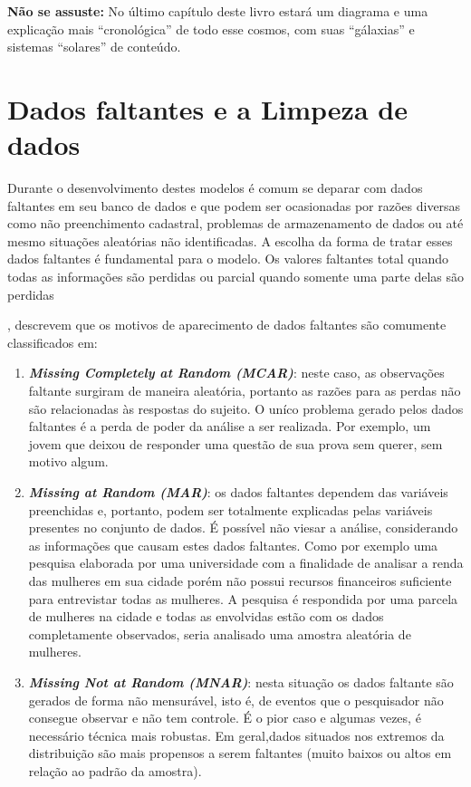 \documentclass[
  openany]{book}
\begin{document}
\textbf{Não se assuste:} No último capítulo deste livro estará um diagrama e uma explicação mais ``cronológica'' de todo esse cosmos, com suas ``gálaxias'' e sistemas ``solares'' de conteúdo.

\hypertarget{dados-faltantes-e-a-limpeza-de-dados}{%
\section{Dados faltantes e a Limpeza de dados}\label{dados-faltantes-e-a-limpeza-de-dados}}

Durante o desenvolvimento destes modelos é comum se deparar com dados faltantes em seu banco de dados e que podem ser ocasionadas por razões diversas como não preenchimento cadastral, problemas de armazenamento de dados ou até mesmo situações aleatórias não identificadas. A escolha da forma de tratar esses dados faltantes é fundamental para o modelo. Os valores faltantes total quando todas as informações são perdidas ou parcial quando somente uma parte delas são perdidas

\citep{little2019statistical}, descrevem que os motivos de aparecimento de dados faltantes são comumente classificados em:

\begin{enumerate}
\def\labelenumi{\arabic{enumi}.}
\item
  \textbf{\emph{Missing Completely at Random (MCAR)}}: neste caso, as observações faltante surgiram de maneira aleatória, portanto as razões para as perdas não são relacionadas às respostas do sujeito. O uníco problema gerado pelos dados faltantes é a perda de poder da análise a ser realizada. Por exemplo, um jovem que deixou de responder uma questão de sua prova sem querer, sem motivo algum.
\item
  \textbf{\emph{Missing at Random (MAR)}}: os dados faltantes dependem das variáveis preenchidas e, portanto, podem ser totalmente explicadas pelas variáveis presentes no conjunto de dados. É possível não viesar a análise, considerando as informações que causam estes dados faltantes. Como por exemplo uma pesquisa elaborada por uma universidade com a finalidade de analisar a renda das mulheres em sua cidade porém não possui recursos financeiros suficiente para entrevistar todas as mulheres. A pesquisa é respondida por uma parcela de mulheres na cidade e todas as envolvidas estão com os dados completamente observados, seria analisado uma amostra aleatória de mulheres.
\item
  \textbf{\emph{Missing Not at Random (MNAR)}}: nesta situação os dados faltante são gerados de forma não mensurável, isto é, de eventos que o pesquisador não consegue observar e não tem controle. É o pior caso e algumas vezes, é necessário técnica mais robustas. Em geral,dados situados nos extremos da distribuição são mais propensos a serem faltantes (muito baixos ou altos em relação ao padrão da amostra).
\end{enumerate}
\end{document}
